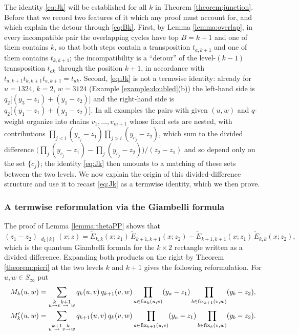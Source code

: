 \documentclass{amsart}
\theoremstyle{definition}
\theoremstyle{remark}
\numberwithin{equation}{section}
\DeclareMathOperator{\qsch}{\widetilde{\mathfrak{S}}}
\newcommand{\xrightsquigarrow}[2][]{%
	\mathrel{\mathop{\rightsquigarrow}\limits^{\scriptstyle #2}%
	\ifx\hfuzz#1\hfuzz\else_{\scriptstyle #1}\fi}%
}
\newcommand{\tom}[1]{\ensuremath{\xrightsquigarrow{#1}}}
\newcommand{\fx}{\mathrm{fix}}
\newcommand{\qelem}{\widetilde{E}}
\begin{document}
The identity \eqref{eq:Jk} will be established for all $k$ in Theorem \ref{theorem:junction}. Before that we record two features of it which any proof must account for, and which explain the detour through \eqref{eq:Bk}. First, by Lemma \ref{lemma:overlap}, in every incompatible pair the overlapping cycles have top $B=k+1$ and one of them contains $k$, so that both steps contain a transposition $t_{a,k+1}$ and one of them contains $t_{k,k+1}$; the incompatibility is a ``detour'' of the level-$(k-1)$ transposition $t_{ak}$ through the position $k+1$, in accordance with $t_{a,k+1}t_{k,k+1}t_{a,k+1}=t_{ak}$. Second, \eqref{eq:Jk} is not a termwise identity: already for $u=1324$, $k=2$, $w=3124$ (Example \ref{example:doubled}(b)) the left-hand side is $q_2\big[(y_3-z_1)+(y_1-z_2)\big]$ and the right-hand side is $q_2\big[(y_1-z_1)+(y_3-z_2)\big]$. In all examples the pairs with given $(u,w)$ and $q$-weight organize into chains $v_1,\ldots,v_{m+1}$ whose fixed sets are nested, with contributions $\prod_{j<i}(y_{c_j}-z_1)\prod_{j>i}(y_{c_j}-z_2)$, which sum to the divided difference $\big(\prod_j(y_{c_j}-z_1)-\prod_j(y_{c_j}-z_2)\big)/(z_2-z_1)$ and so depend only on the set $\{c_j\}$; the identity \eqref{eq:Jk} then amounts to a matching of these sets between the two levels. We now explain the origin of this divided-difference structure and use it to recast \eqref{eq:Jk} as a termwise identity, which we then prove.

\subsubsection*{A termwise reformulation via the Giambelli formula}

The proof of Lemma \ref{lemma:thetaPP} shows that
$$(z_1-z_2)\,\qsch_{d_2[k]}(x;z)=\qelem_{k,k}(x;z_1)\,\qelem_{k+1,k+1}(x;z_2)-\qelem_{k+1,k+1}(x;z_1)\,\qelem_{k,k}(x;z_2),$$
which is the quantum Giambelli formula \cite{fomin1997quantum} for the $k\times2$ rectangle written as a divided difference. Expanding both products on the right by Theorem \ref{theorem:pieri} at the two levels $k$ and $k+1$ gives the following reformulation. For $u,w\in S_\infty$ put
\begin{align*}
M_k(u,w)&=\sum_{u\tom{k}v\tom{k+1}w}q_k(u,v)\,q_{k+1}(v,w)\prod_{a\in\fx_k(u,v)}(y_a-z_1)\prod_{b\in\fx_{k+1}(v,w)}(y_b-z_2),\\
M'_k(u,w)&=\sum_{u\tom{k+1}v\tom{k}w}q_{k+1}(u,v)\,q_k(v,w)\prod_{a\in\fx_{k+1}(u,v)}(y_a-z_1)\prod_{b\in\fx_k(v,w)}(y_b-z_2).
\end{align*}
\end{document}
